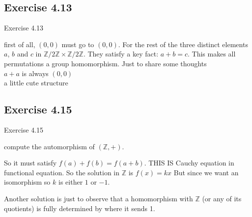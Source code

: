 \documentclass[15pt]{scrartcl}
\begin{document}
\subsection{Exercise 4.13}
\begin{discussion*}Exercise 4.13
    \begin{abboy*}
        first of all, $(0,0)$ must go to $(0,0)$. For the rest of the three distinct elements $a$, $b$ and $c$ in $\mathbb{Z}/2\mathbb{Z} \times \mathbb{Z}/2\mathbb{Z}$. They satisfy a key fact: $a+b=c$. This makes all permutations a group homomorphism. Just to share some thoughts
        \\
        $a+a$ is always $(0,0)$
        \\
        a little cute structure
    \end{abboy*}
\end{discussion*}


\subsection{Exercise 4.15}
\begin{discussion*}Exercise 4.15
    \begin{abboy*}
        compute the automorphism of $(\mathbb{Z},+)$. 

        So it must satisfy $f(a)+f(b)=f(a+b)$. THIS IS Cauchy equation in functional equation. So the solution in $\mathbb{Z}$ is $f(x)=kx$ But since we want an isomorphism so $k$ is either $1$ or $-1$.
    \end{abboy*}
    \begin{evie*}
        Another solution is just to observe that a homomorphism with $\mathbb{Z}$ (or any of its quotients) is fully determined by where it sends 1. 
    \end{evie*}
\end{discussion*}
\end{document}

